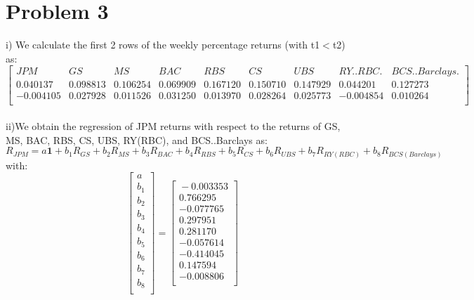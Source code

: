 \documentclass{article}
\begin{document}
\section*{Problem 3}
i) We calculate the first 2 rows of the weekly percentage returns (with t1$<$t2) as:
\begin{equation*}
\begin{bmatrix}{}
 JPM & GS & MS & BAC & RBS & CS & UBS & RY..RBC. & BCS..Barclays. \\ 
 0.040137 & 0.098813 & 0.106254 & 0.069909 & 0.167120 & 0.150710 & 0.147929 & 0.044201 & 0.127273 \\ 
  -0.004105 & 0.027928 & 0.011526 & 0.031250 & 0.013970 & 0.028264 & 0.025773 & -0.004854 & 0.010264 \\ 
  \end{bmatrix}
\end{equation*}
\vspace{5mm} \\
ii)We obtain the regression of JPM returns with respect to the returns of GS, MS, BAC, RBS, CS, UBS, RY(RBC), and BCS..Barclays as:
\begin{equation*}
R_{JPM}  = a\textbf{1} + b_{1}R_{GS} + b_{2}R_{ MS} + b_{3}R_{BAC} +b_{4}R_{ RBS} + b_{5}R_{CS} + b_{6}R_{UBS} + b_{7}R_{RY(RBC)} +b_{8}R_{BCS(Barclays)}
\end{equation*}
with:
\begin{equation*}
\begin{bmatrix}{}
 a \\
 b_{1} \\
 b_{2} \\
 b_{3} \\
b_{4} \\
b_{5} \\
b_{6} \\
b_{7} \\
b_{8} \\
  \end{bmatrix} =
\begin{bmatrix}{}
 -0.003353 \\ 
  0.766295 \\ 
  -0.077765 \\ 
  0.297951 \\ 
  0.281170 \\ 
  -0.057614 \\ 
  -0.414045 \\ 
  0.147594 \\ 
  -0.008806 \\ 
  \end{bmatrix}
\end{equation*}
\end{document}
